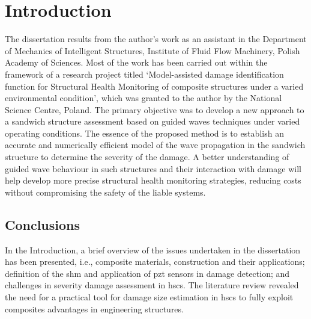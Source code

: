 

\chapter[Introduction]{Introduction}
\label{ch:intro}
The dissertation results from the author’s work as an assistant in the Department of Mechanics of Intelligent Structures, Institute of Fluid Flow Machinery, Polish Academy of Sciences.
Most of the work has been carried out within the framework of a research project titled ‘Model-assisted damage identification function for Structural Health Monitoring of composite structures under a varied environmental condition', which was granted to the author by the National Science Centre, Poland.
The primary objective was to develop a new approach to a sandwich structure assessment based on guided waves techniques under varied operating conditions.
The essence of the proposed method is to establish an accurate and numerically efficient model of the wave propagation in the sandwich structure to determine the severity of the damage.
A better understanding of guided wave behaviour in such structures and their interaction with damage will help develop more precise structural health monitoring strategies, reducing costs without compromising the safety of the liable systems.







\section{Conclusions}
\label{sec:conclusionsIntro}

In the Introduction, a brief overview of the issues undertaken in the dissertation has been presented,  i.e., composite materials, construction and their applications;  definition of the \ac{shm} and application of \ac{pzt} sensors in damage detection; and challenges in severity damage assessment in \acp{hsc}.
The literature review revealed the need for a practical tool for damage size estimation in \acp{hsc} to fully exploit composites advantages in engineering structures.